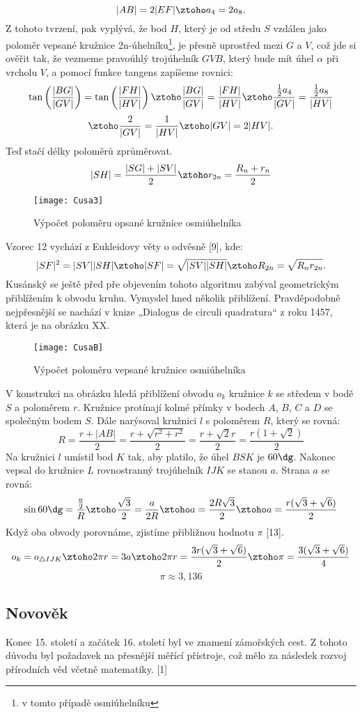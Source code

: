 \documentclass[rocnikovka]{gzwroc} %
\begin{document}
$$
|AB|=2|EF| \ztoho a_4=2a_8.
$$
Z tohoto tvrzení, pak vyplývá, že bod $H$, který je od středu $S$ vzdálen jako poloměr vepsané kružnice 2n-úhelníku\footnote[7]{v tomto případě osmiúhelníku}, je přesně uprostřed mezi $G$ a $V$, což jde si ověřit tak, že vezmeme pravoúhlý trojúhelník $GVB$, který bude mít úhel $\alpha$ při vrcholu $V$, a pomocí funkce tangens zapíšeme rovnici: %
$$
\tan\left(\frac{|BG|}{|GV|}\right)=\tan\left(\frac{|FH|}{|HV|}\right) \ztoho \frac{|BG|}{|GV|}=\frac{|FH|}{|HV|} \ztoho \frac{\frac{1}{2}a_4}{|GV|}=\frac{\frac{1}{2}a_8}{|HV|}
$$
$$
\ztoho \frac{2}{|GV|}=\frac{1}{|HV|} \ztoho |GV|=2|HV|.
$$
Teď stačí délky poloměrů zprůměrovat.
$$
|SH|=\frac{|SG|+|SV|}{2} \ztoho r_{2n}=\frac{R_n+r_n}{2}
$$
\begin{figure}[!ht]
\texttt{[image: Cusa3]}
\caption{Výpočet poloměru opsané kružnice osmiúhelníka}
\label{fig:kruh}
\end{figure}
Vzorec 12 vychází z Eukleidovy věty o odvěsně [9], kde:
$$
|SF|^2=|SV||SH| \ztoho |SF|=\sqrt{|SV||SH|} \ztoho R_{2n}=\sqrt{R_nr_{2n}}.
$$
Kusánský se ještě před pře objevením tohoto algoritmu zabýval geometrickým  přiblížením k obvodu kruhu. Vymyslel hned několik přiblížení. Pravděpodobně nejpřesnější se nachází v knize „Dialogus de circuli quadratura“ z roku 1457, která je na obrázku XX.
\begin{figure}[!ht]
\texttt{[image: CusaB]}
\caption{Výpočet poloměru vepsané kružnice osmiúhelníka}
\label{fig:kruh}
\end{figure}
V konstrukci na obrázku hledá přiblížení obvodu $o_k$ kružnice $k$ se středem v bodě $S$ a poloměrem $r$. Kružnice protínají kolmé přímky v bodech $A$, $B$, $C$ a $D$ se společným bodem $S$. Dále narýsoval kružnici $l$ s poloměrem $R$, který se rovná:
$$
R=\frac{r+|AB|}{2}=\frac{r+\sqrt{r^2+r^2}}{2}=\frac{r+\sqrt{2}r}{2}=\frac{r(1+\sqrt{2})}{2}
$$
Na kružnici $l$ umístil bod $K$ tak, aby platilo, že úhel $BSK$ je $60\dg$. Nakonec vepsal do kružnice $L$ rovnostranný trojúhelník $IJK$ se stanou $a$. Strana $a$ se rovná:
$$
\sin 60\dg =\frac{\frac{a}{2}}{R} \ztoho \frac{\sqrt{3}}{2}= \frac{a}{2R} \ztoho a= \frac{2R\sqrt{3}}{2} \ztoho a= \frac{r(\sqrt{3}+\sqrt{6})}{2}
$$
Když oba obvody porovnáme, zjistíme přibližnou hodnotu $\pi$ [13].
$$
o_k=o_{\triangle IJK} \ztoho 2\pi r=3a \ztoho 2\pi r= \frac{3r(\sqrt{3}+\sqrt{6})}{2} \ztoho \pi= \frac{3(\sqrt{3}+\sqrt{6})}{4}
$$
$$
\pi \approx 3,136
$$
\subsection{Novověk}
Konec 15. století a začátek 16. století byl ve znamení zámořských cest. Z tohoto důvodu byl požadavek na přesnější měřící přístroje, což mělo za následek rozvoj přírodních věd včetně matematiky. [1]
\end{document}
